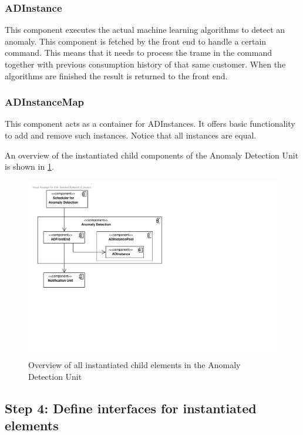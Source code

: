 \subsubsection{ADInstance}

\npar This component executes the actual machine learning algorithms to detect
an anomaly. This component is fetched by the front end to handle a certain
command. This means that it needs to process the trame in the command together
with previous consumption history of that same customer. When the algorithms are
finished the result is returned to the front end.

\subsubsection{ADInstanceMap}

\npar This component acts as a container for ADInstances. It offers basic
functionality to add and remove such instances. Notice that all instances
are equal.

\npar An overview of the instantiated child components of the Anomaly Detection
Unit is shown in \ref{fig:it6/elements}.

\begin{figure}[H]
	\begin{centering}
		\includegraphics[width=\textwidth]{figs/add-it6-elements.pdf}
		\caption{Overview of all instantiated child elements in the Anomaly
		Detection Unit}
		\label{fig:it6/elements}
	\end{centering}
\end{figure}

\subsection{Step 4: Define interfaces for instantiated elements}
\label{add:it6/interfaces}

